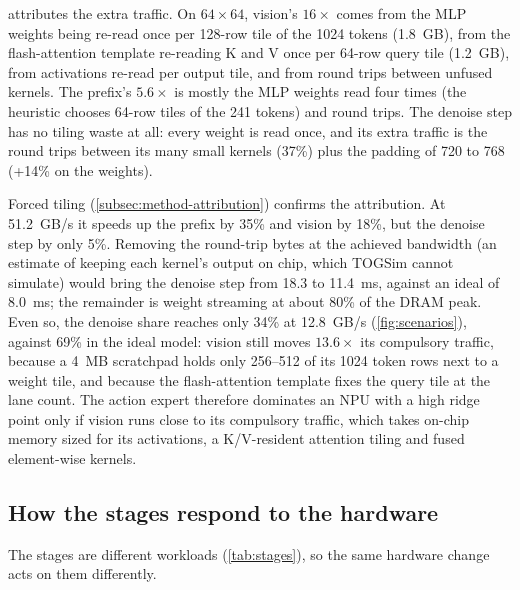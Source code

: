  attributes the extra traffic. On $64\times64$, vision's $16\times$ comes from the MLP weights being re-read once per 128-row tile of the 1024 tokens (1.8~GB), from the flash-attention template re-reading K and V once per 64-row query tile (1.2~GB), from activations re-read per output tile, and from round trips between unfused kernels. The prefix's $5.6\times$ is mostly the MLP weights read four times (the heuristic chooses 64-row tiles of the 241 tokens) and round trips. The denoise step has no tiling waste at all: every weight is read once, and its extra traffic is the round trips between its many small kernels (37\%) plus the padding of 720 to 768 (+14\% on the weights).

Forced tiling (\cref{subsec:method-attribution}) confirms the attribution. At 51.2~GB/s it speeds up the prefix by 35\% and vision by 18\%, but the denoise step by only 5\%. Removing the round-trip bytes at the achieved bandwidth (an estimate of keeping each kernel's output on chip, which TOGSim cannot simulate) would bring the denoise step from 18.3 to 11.4~ms, against an ideal of 8.0~ms; the remainder is weight streaming at about 80\% of the DRAM peak. Even so, the denoise share reaches only 34\% at 12.8~GB/s (\cref{fig:scenarios}), against 69\% in the ideal model: vision still moves $13.6\times$ its compulsory traffic, because a 4~MB scratchpad holds only 256--512 of its 1024 token rows next to a weight tile, and because the flash-attention template fixes the query tile at the lane count. The action expert therefore dominates an NPU with a high ridge point only if vision runs close to its compulsory traffic, which takes on-chip memory sized for its activations, a K/V-resident attention tiling and fused element-wise kernels.

\subsection{How the stages respond to the hardware}
\label{subsec:wl-response}

The stages are different workloads (\cref{tab:stages}), so the same hardware change acts on them differently.

